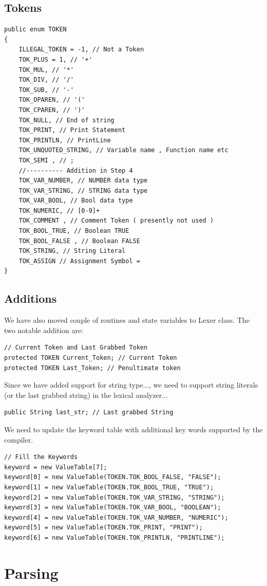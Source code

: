 \subsection{Tokens}
\lstset{style=csharp}
\begin{lstlisting}
public enum TOKEN
{
	ILLEGAL_TOKEN = -1, // Not a Token
	TOK_PLUS = 1, // '+'
	TOK_MUL, // '*'
	TOK_DIV, // '/'
	TOK_SUB, // '-'
	TOK_OPAREN, // '('
	TOK_CPAREN, // ')'
	TOK_NULL, // End of string
	TOK_PRINT, // Print Statement
	TOK_PRINTLN, // PrintLine
	TOK_UNQUOTED_STRING, // Variable name , Function name etc
	TOK_SEMI , // ;
	//---------- Addition in Step 4
	TOK_VAR_NUMBER, // NUMBER data type
	TOK_VAR_STRING, // STRING data type
	TOK_VAR_BOOL, // Bool data type
	TOK_NUMERIC, // [0-9]+
	TOK_COMMENT , // Comment Token ( presently not used )
	TOK_BOOL_TRUE, // Boolean TRUE
	TOK_BOOL_FALSE , // Boolean FALSE
	TOK_STRING, // String Literal
	TOK_ASSIGN // Assignment Symbol =
}
\end{lstlisting}
\subsection{Additions}
We have also moved couple of routines and state variables to Lexer class. The two notable addition are:
\lstset{style=csharp}
\begin{lstlisting}
// Current Token and Last Grabbed Token
protected TOKEN Current_Token; // Current Token
protected TOKEN Last_Token; // Penultimate token
\end{lstlisting}
Since we have added support for string type..., we need to support string literals (or the last grabbed string) in the lexical analyzer...
\lstset{style=csharp}
\begin{lstlisting}
public String last_str; // Last grabbed String
\end{lstlisting}
We need to update the keyword table with additional key words supported by the compiler.
\lstset{style=csharp}
\begin{lstlisting}
// Fill the Keywords
keyword = new ValueTable[7];
keyword[0] = new ValueTable(TOKEN.TOK_BOOL_FALSE, "FALSE");
keyword[1] = new ValueTable(TOKEN.TOK_BOOL_TRUE, "TRUE");
keyword[2] = new ValueTable(TOKEN.TOK_VAR_STRING, "STRING");
keyword[3] = new ValueTable(TOKEN.TOK_VAR_BOOL, "BOOLEAN");
keyword[4] = new ValueTable(TOKEN.TOK_VAR_NUMBER, "NUMERIC");
keyword[5] = new ValueTable(TOKEN.TOK_PRINT, "PRINT");
keyword[6] = new ValueTable(TOKEN.TOK_PRINTLN, "PRINTLINE");
\end{lstlisting}
\section{Parsing}
